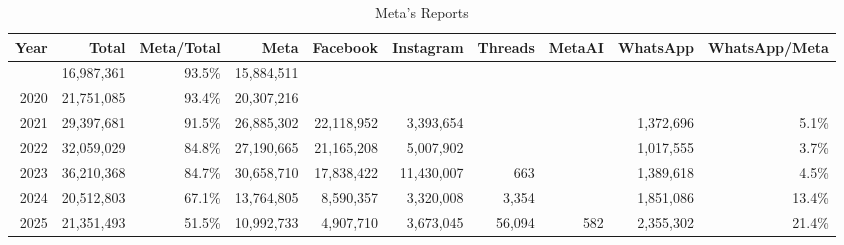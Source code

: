 \begin{table}[!t]
\caption*{
{\large Meta’s Reports}
} 

\fontsize{12.0pt}{14.4pt}\selectfont

\begin{tabular*}{\linewidth}{@{\extracolsep{\fill}}rrrrrrrrrr}
\toprule
Year & Total & Meta/Total & Meta & Facebook & Instagram & Threads & MetaAI & WhatsApp & WhatsApp/Meta \\ 
\midrule\addlinespace[2.5pt]
2019 & 16,987,361 & 93.5\% & 15,884,511 &  &  &  &  &  &  \\
2020 & 21,751,085 & 93.4\% & 20,307,216 &  &  &  &  &  &  \\
2021 & 29,397,681 & 91.5\% & 26,885,302 & 22,118,952 & 3,393,654 &  &  & 1,372,696 & 5.1\% \\
2022 & 32,059,029 & 84.8\% & 27,190,665 & 21,165,208 & 5,007,902 &  &  & 1,017,555 & 3.7\% \\
2023 & 36,210,368 & 84.7\% & 30,658,710 & 17,838,422 & 11,430,007 & 663 &  & 1,389,618 & 4.5\% \\
2024 & 20,512,803 & 67.1\% & 13,764,805 & 8,590,357 & 3,320,008 & 3,354 &  & 1,851,086 & 13.4\% \\
2025 & 21,351,493 & 51.5\% & 10,992,733 & 4,907,710 & 3,673,045 & 56,094 & 582 & 2,355,302 & 21.4\% \\
\bottomrule
\end{tabular*}

\end{table}
